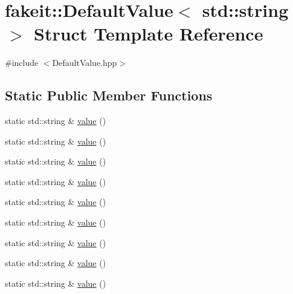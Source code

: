 \hypertarget{structfakeit_1_1DefaultValue_3_01std_1_1string_01_4}{}\section{fakeit\+::Default\+Value$<$ std\+::string $>$ Struct Template Reference}
\label{structfakeit_1_1DefaultValue_3_01std_1_1string_01_4}


{\ttfamily \#include $<$Default\+Value.\+hpp$>$}

\subsection*{Static Public Member Functions}
\begin{DoxyCompactItemize}
\item 
static std\+::string \& \mbox{\hyperlink{structfakeit_1_1DefaultValue_3_01std_1_1string_01_4_a01ff9f569a285bde4c2acd3ece6639f7}{value}} ()
\item 
static std\+::string \& \mbox{\hyperlink{structfakeit_1_1DefaultValue_3_01std_1_1string_01_4_a01ff9f569a285bde4c2acd3ece6639f7}{value}} ()
\item 
static std\+::string \& \mbox{\hyperlink{structfakeit_1_1DefaultValue_3_01std_1_1string_01_4_a01ff9f569a285bde4c2acd3ece6639f7}{value}} ()
\item 
static std\+::string \& \mbox{\hyperlink{structfakeit_1_1DefaultValue_3_01std_1_1string_01_4_a01ff9f569a285bde4c2acd3ece6639f7}{value}} ()
\item 
static std\+::string \& \mbox{\hyperlink{structfakeit_1_1DefaultValue_3_01std_1_1string_01_4_a01ff9f569a285bde4c2acd3ece6639f7}{value}} ()
\item 
static std\+::string \& \mbox{\hyperlink{structfakeit_1_1DefaultValue_3_01std_1_1string_01_4_a01ff9f569a285bde4c2acd3ece6639f7}{value}} ()
\item 
static std\+::string \& \mbox{\hyperlink{structfakeit_1_1DefaultValue_3_01std_1_1string_01_4_a01ff9f569a285bde4c2acd3ece6639f7}{value}} ()
\item 
static std\+::string \& \mbox{\hyperlink{structfakeit_1_1DefaultValue_3_01std_1_1string_01_4_a01ff9f569a285bde4c2acd3ece6639f7}{value}} ()
\item 
static std\+::string \& \mbox{\hyperlink{structfakeit_1_1DefaultValue_3_01std_1_1string_01_4_a01ff9f569a285bde4c2acd3ece6639f7}{value}} ()
\end{DoxyCompactItemize}



